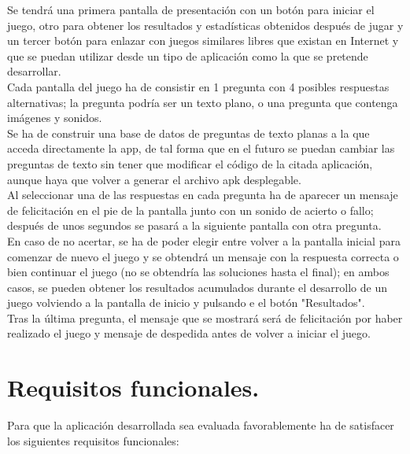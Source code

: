\documentclass[10pt]{article}
\begin{document}
Se tendrá una primera pantalla de presentación con un botón para iniciar el juego, otro para obtener los resultados y estadísticas obtenidos después de jugar y un tercer botón para enlazar con juegos similares libres que existan en Internet y que se puedan utilizar desde un tipo de aplicación como la que se pretende desarrollar.\\

Cada pantalla del juego ha de consistir en 1 pregunta con 4 posibles respuestas alternativas; la pregunta podría ser un texto plano, o una pregunta que contenga imágenes y sonidos.\\

Se ha de construir una base de datos de preguntas de texto planas a la que acceda directamente la app, de tal forma que en el futuro se puedan cambiar las preguntas de texto sin tener que modificar el código de la citada aplicación, aunque haya que volver a generar el archivo apk desplegable.\\

Al seleccionar una de las respuestas en cada pregunta ha de aparecer un mensaje de felicitación en el pie de la pantalla junto con un sonido de acierto o fallo; después de unos segundos se pasará a la siguiente pantalla con otra pregunta.\\

En caso de no acertar, se ha de poder elegir entre volver a la pantalla inicial para comenzar de nuevo el juego y se obtendrá un mensaje con la respuesta correcta o bien continuar el juego (no se obtendría las soluciones hasta el final); en ambos casos, se pueden obtener los resultados acumulados durante el desarrollo de un juego volviendo a la pantalla de inicio y pulsando e el botón "Resultados".\\

Tras la última pregunta, el mensaje que se mostrará será de felicitación por haber realizado el juego y mensaje de despedida antes de volver a iniciar el juego.\\


\section{Requisitos funcionales.}

Para que la aplicación desarrollada sea evaluada favorablemente ha de satisfacer los siguientes requisitos funcionales:\\
\end{document}
